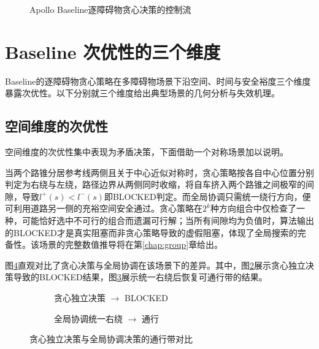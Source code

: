 \begin{figure}[htbp]
\centering
{}
\caption{Apollo Baseline逐障碍物贪心决策的控制流}
\label{fig:baseline_greedy_flow}
\end{figure}

\section{Baseline 次优性的三个维度}
Baseline的逐障碍物贪心策略在多障碍物场景下沿空间、时间与安全裕度三个维度暴露次优性。以下分别就三个维度给出典型场景的几何分析与失效机理。

\subsection{空间维度的次优性}

空间维度的次优性集中表现为矛盾决策，下面借助一个对称场景加以说明。

当两个路锥分居参考线两侧且关于中心近似对称时，贪心策略按各自中心位置分别判定为右绕与左绕，路径边界从两侧同时收缩，将自车挤入两个路锥之间极窄的间隙，导致$l^{+}(s) < l^{-}(s)$即BLOCKED判定。而全局协调只需统一绕行方向，便可利用道路另一侧的充裕空间安全通过。贪心策略在$2^k$种方向组合中仅检查了一种，可能恰好选中不可行的组合而遗漏可行解；当所有间隙均为负值时，算法输出的BLOCKED才是真实阻塞而非贪心策略导致的虚假阻塞，体现了全局搜索的完备性。该场景的完整数值推导将在第\ref{chap:group}章给出。

图\ref{fig:greedy_vs_global}直观对比了贪心决策与全局协调在该场景下的差异。其中，图\ref{fig:greedy_vs_global:a}展示贪心独立决策导致的BLOCKED结果，图\ref{fig:greedy_vs_global:b}展示统一右绕后恢复可通行带的结果。

\begin{figure}[htbp]
\centering
\begin{subfigure}[b]{0.48\textwidth}
  \centering
  \caption{贪心独立决策 $\to$ BLOCKED}
  \label{fig:greedy_vs_global:a}
\end{subfigure}\hfill
\begin{subfigure}[b]{0.48\textwidth}
  \centering
  \caption{全局协调统一右绕 $\to$ 通行}
  \label{fig:greedy_vs_global:b}
\end{subfigure}
\caption{贪心独立决策与全局协调决策的通行带对比}
\label{fig:greedy_vs_global}
\end{figure}

